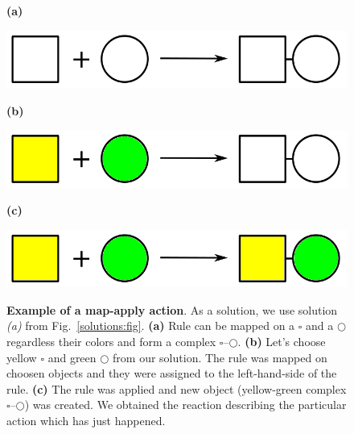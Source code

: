 \documentclass[12pt]{fithesis2}
\begin{document}
\begin{figure}
\begin{center}
\begin{minipage}[l]{0.1\textwidth}
    \textbf{(a)}
  \end{minipage}
  \begin{minipage}[r]{0.6\textwidth}
    {\hspace*{1.3cm}\includegraphics[scale=0.2]{pics/rule_complex}}
\end{minipage}

\begin{minipage}[l]{0.1\textwidth}
    \textbf{(b)}
  \end{minipage}
  \begin{minipage}[r]{0.6\textwidth}
    {\hspace*{1.3cm}\includegraphics[scale=0.2]{pics/rule_complex_mapped}}
\end{minipage}

\begin{minipage}[l]{0.1\textwidth}
    \textbf{(c)}
  \end{minipage}
  \begin{minipage}[r]{0.6\textwidth}
    {\hspace*{1.3cm}\includegraphics[scale=0.2]{pics/rule_reaction}}
\end{minipage}
\caption{\textbf{Example of a map-apply action}. As a solution, we use solution \textit{(a)} from Fig.~\ref{solutions:fig}. \textbf{(a)} Rule can be mapped on a $\square$ and a $\bigcirc$ regardless their colors and form a complex $\square$--$\bigcirc$.  \textbf{(b)} Let's choose yellow $\square$ and green $\bigcirc$ from our solution. The rule was mapped on choosen objects and they were assigned to the left-hand-side of the rule. \textbf{(c)} The rule was applied and new object (yellow-green complex $\square$--$\bigcirc$) was created. We obtained the reaction describing the particular action which has just happened.}
\label{map-apply:fig}
\end{center}
\end{figure}
\end{document}

